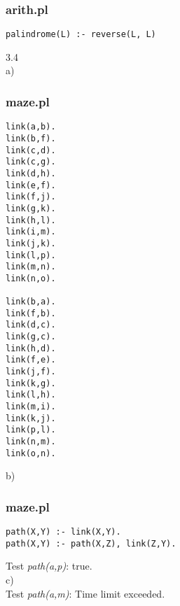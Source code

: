 \documentclass{article}
\begin{document}
\subsubsection*{arith.pl}
\begin{lstlisting} 
palindrome(L) :- reverse(L, L)
\end{lstlisting}
3.4
\\
a)
\subsubsection*{maze.pl}
\begin{lstlisting} 
link(a,b).
link(b,f).
link(c,d).
link(c,g).
link(d,h).
link(e,f).
link(f,j).
link(g,k).
link(h,l).
link(i,m).
link(j,k).
link(l,p).
link(m,n).
link(n,o).

link(b,a).
link(f,b).
link(d,c).
link(g,c).
link(h,d).
link(f,e).
link(j,f).
link(k,g).
link(l,h).
link(m,i).
link(k,j).
link(p,l).
link(n,m).
link(o,n).
\end{lstlisting}
b)
\subsubsection*{maze.pl}
\begin{lstlisting} 
path(X,Y) :- link(X,Y).
path(X,Y) :- path(X,Z), link(Z,Y).
\end{lstlisting}
Test \emph{path(a,p)}: true.
\\
c)
\\
Test \emph{path(a,m)}: Time limit exceeded.
\\
\end{document}
